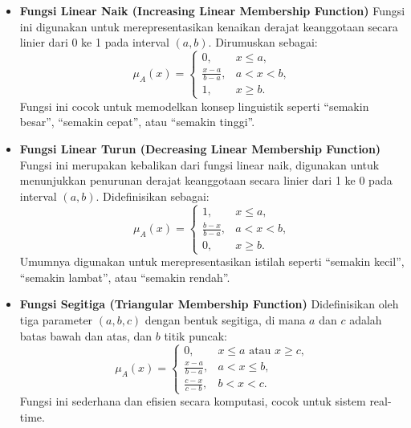 \documentclass[12pt,a4paper]{article}
\theoremstyle{remark}
\begin{document}
\begin{itemize}
    \item \textbf{Fungsi Linear Naik (Increasing Linear Membership Function)}
          Fungsi ini digunakan untuk merepresentasikan kenaikan derajat keanggotaan secara linier dari 0 ke 1 pada interval \((a,b)\).
          Dirumuskan sebagai:
          \[
              \mu_A(x) =
              \begin{cases}
                  0,               & x \leq a,  \\
                  \frac{x-a}{b-a}, & a < x < b, \\
                  1,               & x \geq b.
              \end{cases}
          \]
          Fungsi ini cocok untuk memodelkan konsep linguistik seperti “semakin besar”, “semakin cepat”, atau “semakin tinggi”.

    \item \textbf{Fungsi Linear Turun (Decreasing Linear Membership Function)}
          Fungsi ini merupakan kebalikan dari fungsi linear naik, digunakan untuk menunjukkan penurunan derajat keanggotaan secara linier dari 1 ke 0 pada interval \((a,b)\).
          Didefinisikan sebagai:
          \[
              \mu_A(x) =
              \begin{cases}
                  1,               & x \leq a,  \\
                  \frac{b-x}{b-a}, & a < x < b, \\
                  0,               & x \geq b.
              \end{cases}
          \]
          Umumnya digunakan untuk merepresentasikan istilah seperti “semakin kecil”, “semakin lambat”, atau “semakin rendah”.

    \item \textbf{Fungsi Segitiga (Triangular Membership Function)}
          Didefinisikan oleh tiga parameter \((a,b,c)\) dengan bentuk segitiga, di mana \(a\) dan \(c\) adalah batas bawah dan atas, dan \(b\) titik puncak:
          \[
              \mu_A(x) =
              \begin{cases}
                  0,               & x \leq a \text{ atau } x \geq c, \\
                  \frac{x-a}{b-a}, & a < x \leq b,                    \\
                  \frac{c-x}{c-b}, & b < x < c.
              \end{cases}
          \]
          Fungsi ini sederhana dan efisien secara komputasi, cocok untuk sistem real-time.


\end{itemize}
\end{document}

